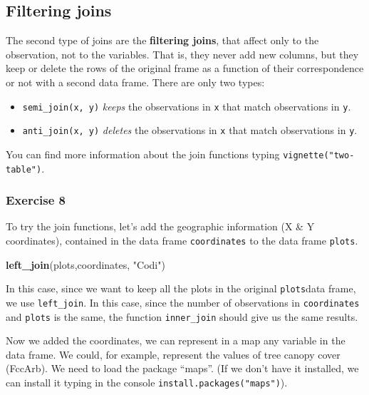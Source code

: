 \documentclass[]{article}
\newenvironment{Shaded}{\begin{snugshade}}{\end{snugshade}}
\newcommand{\KeywordTok}[1]{\textcolor[rgb]{0.13,0.29,0.53}{\textbf{#1}}}
\newcommand{\StringTok}[1]{\textcolor[rgb]{0.31,0.60,0.02}{#1}}
\newcommand{\NormalTok}[1]{#1}
\providecommand{\tightlist}{%
  \setlength{\itemsep}{0pt}\setlength{\parskip}{0pt}}
\begin{document}
\subsection{Filtering joins}\label{filtering-joins}

The second type of joins are the \textbf{filtering joins}, that affect
only to the observation, not to the variables. That is, they never add
new columns, but they keep or delete the rows of the original frame as a
function of their correspondence or not with a second data frame. There
are only two types:

\begin{itemize}
\tightlist
\item
  \texttt{semi\_join(x,\ y)} \emph{keeps} the observations in \texttt{x}
  that match observations in \texttt{y}.
\item
  \texttt{anti\_join(x,\ y)} \emph{deletes} the observations in
  \texttt{x} that match observations in \texttt{y}.
\end{itemize}

You can find more information about the join functions typing
\texttt{vignette("two-table")}.

\subsubsection{Exercise 8}\label{exercise-8}

To try the join functions, let's add the geographic information (X \& Y
coordinates), contained in the data frame \texttt{coordinates} to the
data frame \texttt{plots}.

\begin{Shaded}
\begin{Highlighting}[]
\KeywordTok{left_join}\NormalTok{(plots,coordinates, }\StringTok{"Codi"}\NormalTok{)}
\end{Highlighting}
\end{Shaded}

In this case, since we want to keep all the plots in the original
\texttt{plots}data frame, we use \texttt{left\_join}. In this case,
since the number of observations in \texttt{coordinates} and
\texttt{plots} is the same, the function \texttt{inner\_join} should
give us the same results.

Now we added the coordinates, we can represent in a map any variable in
the data frame. We could, for example, represent the values of tree
canopy cover (FccArb). We need to load the package ``maps''. (If we
don't have it installed, we can install it typing in the console
\texttt{install.packages("maps")}).
\end{document}
